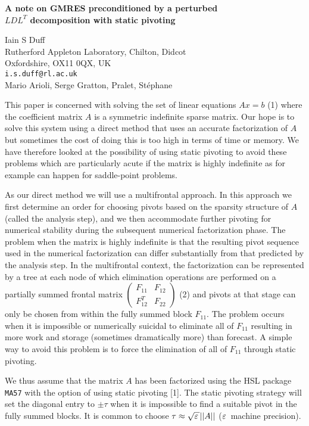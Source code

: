 \documentclass[twosided]{report}
\newcommand{\TwoMatrx}[4]{ \left(
	\begin{array}{cc}
	#1 & #2 \\
	#3 & #4
	\end{array}
	\right) }
\begin{document}
\begin{center}
{\large			%
{\bf A note on GMRES preconditioned by a perturbed \\
$LDL^T$ decomposition with static pivoting}}

	Iain S Duff \\
	Rutherford Appleton Laboratory, Chilton, Didcot \\
	Oxfordshire, OX11 0QX, UK \\
	{\tt i.s.duff@rl.ac.uk} \\
	Mario Arioli, Serge Gratton, Pralet, St\'ephane
\end{center}
This paper is concerned with solving the set of linear
equations $A x = b$ (1)
where the coefficient matrix $A$ is a
symmetric indefinite sparse matrix. Our hope is to solve
this system using a direct method that uses an accurate
factorization of $A$ but sometimes the cost of doing this is
too high in terms of time or memory. We have therefore
looked at the possibility of using static pivoting to avoid
these problems which are particularly acute if the matrix is
highly indefinite as for example can happen for saddle-point
problems.

As our direct method we will use a multifrontal
approach. In this approach we first determine an order for
choosing pivots based on the sparsity structure of $A$
(called the analysis step), and we then accommodate further
pivoting for numerical stability during the subsequent
numerical factorization phase. The problem when the matrix
is highly indefinite is that the resulting pivot sequence
used in the numerical factorization can differ substantially
from that predicted by the analysis step. In the
multifrontal context, the factorization can be represented
by a tree at each node of which elimination operations are
performed on a partially summed frontal matrix
$\TwoMatrx{F_{11}}{F_{12}}{F_{12}^T}{F_{22}}$ (2)
and pivots at that stage can only
be chosen from within the fully summed block $F_{11}$. The
problem occurs when it is impossible or numerically suicidal
to eliminate all of $F_{11}$ resulting in more work and
storage (sometimes dramatically more) than forecast. A
simple way to avoid this problem is to force the elimination
of all of $F_{11}$ through static pivoting.

We thus
assume that the matrix $A$ has been factorized using the HSL
package {\tt MA57} with the option of using static pivoting
[1]. The static pivoting strategy will set the
diagonal entry to $\pm\tau$ when it is impossible to find a
suitable pivot in the fully summed blocks. It is common to
choose $\tau \approx \sqrt{{{\bf \varepsilon }\,}} ||A||$
(${{\bf \varepsilon }\,}$ machine precision).
\end{document}
